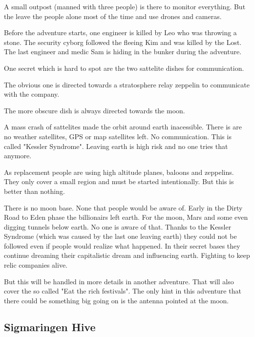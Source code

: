 A small outpost (manned with three people) is there to monitor everything. But the leave the people alone most of the time and use drones and cameras.

Before the adventure starts, one engineer is killed by Leo who was throwing a stone. The security cyborg followed the fleeing Kim and was killed by the Lost.
The last engineer and medic Sam is hiding in the bunker during the adventure.

One secret which is hard to spot are the two sattelite dishes for communication.

The obvious one is directed towards a stratosphere relay zeppelin to communicate with the company.

The more obscure dish is always directed towards the moon.

\begin{sidebarBox}[title=Kessler Syndrome]

    A mass crash of sattelites made the orbit around earth inacessible. There is are no weather satellites, GPS or map satellites left. No communication.
    This is called "Kessler Syndrome". Leaving earth is high risk and no one tries that anymore.

    As replacement people are using high altitude planes, baloons and zeppelins. They only cover a small region and must be started intentionally. But this is better than nothing.
\end{sidebarBox}


\begin{sidebarBox}[title=Moon base]

    There is no moon base. None that people would be aware of. Early in the Dirty Road to Eden phase the billionairs left earth. For the moon, Mars and some even digging tunnels below earth. No one is aware of that. Thanks to the Kessler Syndrome (which was caused by the last one leaving earth) they could not be followed even if people would realize what happened.
    In their secret bases they continue dreaming their capitalistic dream and influencing earth. Fighting to keep relic companies alive.

    But this will be handled in more details in another adventure. That will also cover the so called "Eat the rich festivals". The only hint in this adventure that there could be something big going on is the antenna pointed at the moon.
\end{sidebarBox}

\subsection{Sigmaringen Hive}

